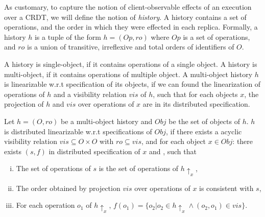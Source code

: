 { As customary, to capture the notion of client-observable effects of an execution over a CRDT, we will define the notion of \emph{history}. A history contains a set of operations, and the order in which they were effected in each replica. Formally, a history $h$ is a tuple of the form $h = (Op,\mathit{ro})$ where $Op$ is a set of operations, and $\mathit{ro}$ is a union of transitive, irreflexive and total orders of identifiers of $O$.


A history is single-object, if it contains operations of a single object. A history is multi-object, if it contains operations of multiple object. A multi-object history $h$ is linearizable w.r.t specification of its objects, if we can found the linearization of operations of $h$ and a visibility relation $\mathit{vis}$ of $h$, such that for each objects $x$, the projection of $h$ and $\mathit{vis}$ over operations of $x$ are in its distributed specification.


\begin{definition}
\label{definition:distributed linearizability}

Let $h = (O,\mathit{ro})$ be a multi-object history and $\mathit{Obj}$ be the set of objects of $h$. $h$ is distributed linearizable w.r.t specifications of $\mathit{Obj}$, if there exists a acyclic visibility relation $\mathit{vis} \subseteq O \times O$ with $\mathit{ro} \subseteq \mathit{vis}$, and for each object $x \in \mathit{Obj}$: there exists $(s,f)$ in distributed specification of $x$ and , such that

\begin{enumerate}[(i)]
\item The set of operations of $s$ is the set of operations of $h \uparrow_{x}$,
\item The order obtained by projection $\mathit{vis}$ over operations of $x$ is consistent with $s$,
\item For each operation $o_1$ of $h \uparrow_{x}$, $f(o_1) = \{ o_2 \vert o_2 \in h \uparrow_{x} \wedge (o_2,o_1) \in \mathit{vis} \}$.
\end{enumerate}


\end{definition}}

